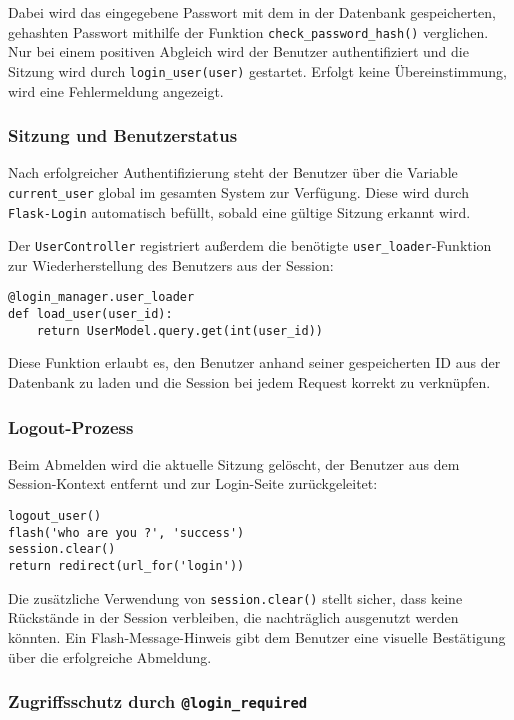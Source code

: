 \documentclass[12pt]{article}
\begin{document}
\noindent Dabei wird das eingegebene Passwort mit dem in der Datenbank gespeicherten, gehashten Passwort mithilfe der Funktion \texttt{check\_password\_hash()} verglichen. Nur bei einem positiven Abgleich wird der Benutzer authentifiziert und die Sitzung wird durch \texttt{login\_user(user)} gestartet. Erfolgt keine Übereinstimmung, wird eine Fehlermeldung angezeigt.

\subsubsection*{Sitzung und Benutzerstatus}

Nach erfolgreicher Authentifizierung steht der Benutzer über die Variable \texttt{current\_user} global im gesamten System zur Verfügung. Diese wird durch \texttt{Flask-Login} automatisch befüllt, sobald eine gültige Sitzung erkannt wird.

\noindent Der \texttt{UserController} registriert außerdem die benötigte \texttt{user\_loader}-Funktion zur Wiederherstellung des Benutzers aus der Session:


\begin{verbatim}
@login_manager.user_loader
def load_user(user_id):
    return UserModel.query.get(int(user_id))
\end{verbatim}

\noindent Diese Funktion erlaubt es, den Benutzer anhand seiner gespeicherten ID aus der Datenbank zu laden und die Session bei jedem Request korrekt zu verknüpfen.
\newpage
\subsubsection*{Logout-Prozess}

Beim Abmelden wird die aktuelle Sitzung gelöscht, der Benutzer aus dem Session-Kontext entfernt und zur Login-Seite zurückgeleitet:

\noindent
\begin{verbatim}
logout_user()
flash('who are you ?', 'success')
session.clear()
return redirect(url_for('login'))
\end{verbatim}

\noindent Die zusätzliche Verwendung von \texttt{session.clear()} stellt sicher, dass keine Rückstände in der Session verbleiben, die nachträglich ausgenutzt werden könnten. Ein Flash-Message-Hinweis gibt dem Benutzer eine visuelle Bestätigung über die erfolgreiche Abmeldung.

\subsubsection*{Zugriffsschutz durch \texttt{@login\_required}}
\end{document}
